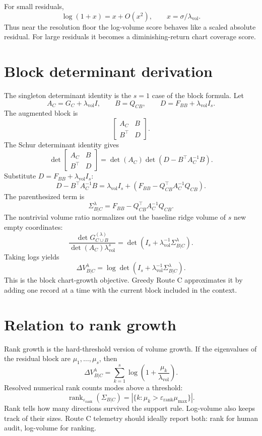 \documentclass[10pt,twocolumn]{article}
\newcommand{\rank}{\operatorname{rank}}
\newcommand{\eps}{\varepsilon}
\newcommand{\vol}{\mathrm{vol}}
\begin{document}
For small residuals,
\[
\log(1+x)=x+O(x^2),
\qquad x=\sigma/\lambda_{\vol}.
\]
Thus near the resolution floor the log-volume score behaves like a scaled
absolute residual. For large residuals it becomes a diminishing-return chart
coverage score.

\section{Block determinant derivation}

The singleton determinant identity is the $s=1$ case of the block formula. Let
\[
A_C=G_C+\lambda_{\vol}I,
\qquad
B=Q_{CB},
\qquad
D=F_{BB}+\lambda_{\vol}I_s.
\]
The augmented block is
\[
\begin{bmatrix}
A_C & B\\
B^\top & D
\end{bmatrix}.
\]
The Schur determinant identity gives
\[
\det\begin{bmatrix}A_C&B\\B^\top&D\end{bmatrix}
=\det(A_C)\det(D-B^\top A_C^{-1}B).
\]
Substitute $D=F_{BB}+\lambda_{\vol}I_s$:
\[
D-B^\top A_C^{-1}B
=\lambda_{\vol}I_s+
\left(F_{BB}-Q_{CB}^\top A_C^{-1}Q_{CB}\right).
\]
The parenthesized term is
\[
\Sigma_{B|C}^{\lambda}=F_{BB}-Q_{CB}^\top A_C^{-1}Q_{CB}.
\]
The nontrivial volume ratio normalizes out the baseline ridge volume of $s$ new
empty coordinates:
\[
\frac{\det G_{C\cup B}^{(\lambda)}}
{\det(A_C)\lambda_{\vol}^s}
=\det\left(I_s+\lambda_{\vol}^{-1}\Sigma_{B|C}^{\lambda}\right).
\]
Taking logs yields
\[
\Delta V_{B|C}^{\lambda}
=\log\det\left(I_s+\lambda_{\vol}^{-1}\Sigma_{B|C}^{\lambda}\right).
\]
This is the block chart-growth objective. Greedy Route C approximates it by
adding one record at a time with the current block included in the context.

\section{Relation to rank growth}

Rank growth is the hard-threshold version of volume growth. If the eigenvalues
of the residual block are $\mu_1,\ldots,\mu_s$, then
\[
\Delta V_{B|C}^{\lambda}
=\sum_{k=1}^s\log\left(1+\frac{\mu_k}{\lambda_{\vol}}\right).
\]
Resolved numerical rank counts modes above a threshold:
\[
\rank_{\eps_{\rank}}(\Sigma_{B|C})
=\left|\{k:\mu_k>\eps_{\rank}\mu_{\max}\}\right|.
\]
Rank tells how many directions survived the support rule. Log-volume also keeps
track of their sizes. Route C telemetry should ideally report both: rank for
human audit, log-volume for ranking.
\end{document}
